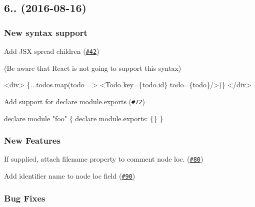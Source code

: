 \subsection*{6.. (2016-\/08-\/16)}

\subsubsection*{New syntax support}


\begin{DoxyItemize}
\item Add J\+SX spread children (\href{https://github.com/babel/babylon/pull/42}{\tt \#42}) 
\end{DoxyItemize}

(Be aware that React is not going to support this syntax)


\begin{DoxyCode}
<div>
  \{...todos.map(todo => <Todo key=\{todo.id\} todo=\{todo\}/>)\}
</div>
\end{DoxyCode}



\begin{DoxyItemize}
\item Add support for declare module.\+exports (\href{https://github.com/babel/babylon/pull/72}{\tt \#72}) 
\end{DoxyItemize}


\begin{DoxyCode}
declare module "foo" \{
  declare module.exports: \{\}
\}
\end{DoxyCode}


\subsubsection*{New Features}


\begin{DoxyItemize}
\item If supplied, attach filename property to comment node loc. (\href{https://github.com/babel/babylon/pull/80}{\tt \#80}) 
\item Add identifier name to node loc field (\href{https://github.com/babel/babylon/pull/90}{\tt \#90}) 
\end{DoxyItemize}

\subsubsection*{Bug Fixes}


